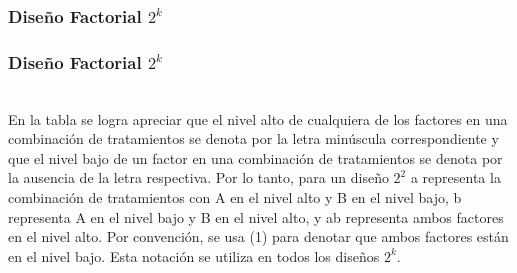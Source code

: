 \documentclass[12pt]{beamer}
\begin{document}
\begin{frame}
\frametitle{Diseño Factorial $ 2^{k} $}
\begin{table}[H]
  \centering
  \caption{Matriz de Diseño}
  \label{tab:addlabel}%
\end{table}%
\end{frame}

\begin{frame}
\frametitle{Diseño Factorial $ 2^{k} $}
~\\En la tabla se logra apreciar que el nivel alto de cualquiera de los factores en una combinación de tratamientos se denota por la letra minúscula correspondiente y que el nivel bajo de un factor en una combinación de tratamientos se denota por la ausencia de la letra respectiva. Por lo tanto, para un diseño $2^2$ a representa la combinación de tratamientos con A en el nivel alto y B en el nivel bajo, b representa A en el nivel bajo y B en el nivel alto, y ab representa ambos factores en el nivel alto. Por convención, se usa (1) para denotar que ambos factores están en el nivel bajo. Esta notación se utiliza en todos los diseños $2^k$.
\end{frame}
\end{document}
